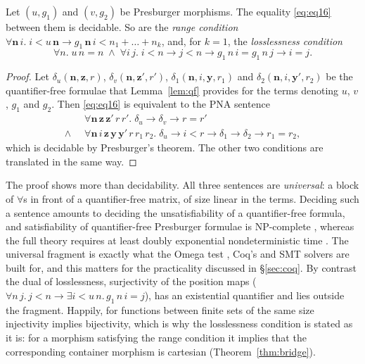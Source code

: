 \documentclass{fundam}
\begin{document}
\begin{theorem}[Decidability]\label{thm:decidable}
  Let $(u, g_1)$ and $(v, g_2)$ be Presburger morphisms.  The equality \eqref{eq:eq16}
  between them is decidable.  So are the \emph{range condition}
  $\forall \mathbf{n}\,i.\; i < u\,\mathbf{n} \to g_1\,\mathbf{n}\,i < n_1 + \dots + n_k$,
  and, for $k = 1$, the \emph{losslessness condition}
  \[
    \forall n.\; u\,n = n \;\wedge\; \forall i\,j.\; i < n \to j < n \to g_1\,n\,i = g_1\,n\,j \to i = j .
  \]
\end{theorem}

\begin{proof}
  Let $\delta_u(\mathbf{n}, \mathbf{z}, r)$, $\delta_v(\mathbf{n}, \mathbf{z}', r')$,
  $\delta_1(\mathbf{n}, i, \mathbf{y}, r_1)$ and $\delta_2(\mathbf{n}, i, \mathbf{y}', r_2)$
  be the quantifier-free formulae that Lemma~\ref{lem:qf} provides for the terms denoting
  $u$, $v$, $g_1$ and $g_2$.  Then \eqref{eq:eq16} is equivalent to the PNA sentence
  \begin{align*}
    &\forall \mathbf{n}\,\mathbf{z}\,\mathbf{z}'\,r\,r'.\;
       \delta_u \to \delta_v \to r = r' \\
    \wedge\;\;&\forall \mathbf{n}\,i\,\mathbf{z}\,\mathbf{y}\,\mathbf{y}'\,r\,r_1\,r_2.\;
       \delta_u \to i < r \to \delta_1 \to \delta_2 \to r_1 = r_2 ,
  \end{align*}
  which is decidable by Presburger's theorem.  The other two conditions are
  translated in the same way.
\end{proof}

The proof shows more than decidability.  All three sentences are \emph{universal}: a
block of $\forall$s in front of a quantifier-free matrix, of size linear in the terms.
Deciding such a sentence amounts to deciding the unsatisfiability of a quantifier-free
formula, and satisfiability of quantifier-free Presburger formulae is NP-complete
\cite{Papadimitriou81}, whereas the full theory requires at least doubly exponential
nondeterministic time \cite{FischerRabin74}.  The universal fragment is exactly what the
Omega test \cite{Pugh91}, Coq's  and SMT solvers are built for, and this matters
for the practicality discussed in \S\ref{sec:coq}.  By contrast the dual of losslessness,
surjectivity of the position maps ($\forall n\,j.\, j < n \to \exists i < u\,n.\, g_1\,n\,i = j$),
has an existential quantifier and lies outside the fragment.  Happily, for functions
between finite sets of the same size injectivity implies bijectivity, which is why the
losslessness condition is stated as it is: for a morphism satisfying the range condition
it implies that the corresponding container morphism is cartesian
(Theorem~\ref{thm:bridge}).
\end{document}

